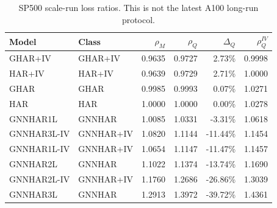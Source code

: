 \begin{table}[H]
\centering
\scriptsize
\begin{tabular}{llrrrr}
\toprule
Model & Class & $\rho_M$ & $\rho_Q$ & $\Delta_Q$ & $\rho_Q^{IV}$ \\
\midrule
GHAR+IV & GHAR+IV & 0.9635 & 0.9727 & 2.73\% & 0.9998 \\
HAR+IV & HAR+IV & 0.9639 & 0.9729 & 2.71\% & 1.0000 \\
GHAR & GHAR & 0.9985 & 0.9993 & 0.07\% & 1.0271 \\
HAR & HAR & 1.0000 & 1.0000 & 0.00\% & 1.0278 \\
GNNHAR1L & GNNHAR & 1.0085 & 1.0331 & -3.31\% & 1.0618 \\
GNNHAR3L-IV & GNNHAR+IV & 1.0820 & 1.1144 & -11.44\% & 1.1454 \\
GNNHAR1L-IV & GNNHAR+IV & 1.0654 & 1.1147 & -11.47\% & 1.1457 \\
GNNHAR2L & GNNHAR & 1.1022 & 1.1374 & -13.74\% & 1.1690 \\
GNNHAR2L-IV & GNNHAR+IV & 1.1760 & 1.2686 & -26.86\% & 1.3039 \\
GNNHAR3L & GNNHAR & 1.2913 & 1.3972 & -39.72\% & 1.4361 \\
\bottomrule
\end{tabular}
\caption{SP500 scale-run loss ratios.  This is not the latest A100 long-run protocol.}
\label{tab:sp500-loss}
\end{table}
